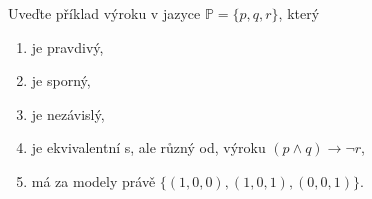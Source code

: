 \documentclass[a4paper,12pt]{article}
\begin{document}
\medskip\begin{problem}
    Uveďte příklad výroku v jazyce $\mathbb P=\{p,q,r\}$, který
    \begin{enumerate}
    \item je pravdivý,
    \item je sporný,
    \item je nezávislý,
    \item je ekvivalentní s, ale různý od, výroku $(p\wedge q)\to\neg r$,
    \item má za modely právě $\{(1,0,0),(1,0,1),(0,0,1)\}$.
    \end{enumerate}
\end{problem}
\end{document}
